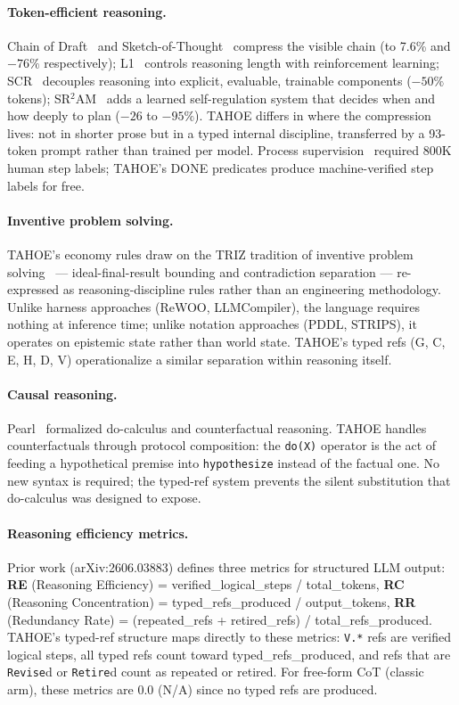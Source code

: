 \documentclass[11pt,a4paper]{article}
\begin{document}
\paragraph{Token-efficient reasoning.}
Chain of Draft~\cite{xu2025cod} and Sketch-of-Thought~\cite{lee2025sketch} compress the visible chain (to 7.6\% and $-76\%$ respectively); L1~\cite{aggarwal2025l1} controls reasoning length with reinforcement learning; SCR~\cite{han2026scr} decouples reasoning into explicit, evaluable, trainable components ($-50\%$ tokens); SR$^2$AM~\cite{deng2026sr2am} adds a learned self-regulation system that decides when and how deeply to plan ($-26$ to $-95\%$). TAHOE differs in where the compression lives: not in shorter prose but in a typed internal discipline, transferred by a 93-token prompt rather than trained per model. Process supervision~\cite{lightman2023verify} required 800K human step labels; TAHOE's DONE predicates produce machine-verified step labels for free.

\paragraph{Inventive problem solving.}
TAHOE's economy rules draw on the TRIZ tradition of inventive problem solving~\cite{altshuller1984creativity} --- ideal-final-result bounding and contradiction separation --- re-expressed as reasoning-discipline rules rather than an engineering methodology. Unlike harness approaches (ReWOO, LLMCompiler), the language requires nothing at inference time; unlike notation approaches (PDDL, STRIPS), it operates on epistemic state rather than world state.
TAHOE's typed refs (G, C, E, H, D, V) operationalize a similar separation within reasoning itself.

\paragraph{Causal reasoning.}
Pearl~\cite{pearl2009causality} formalized do-calculus and counterfactual reasoning.
TAHOE handles counterfactuals through protocol composition: the \texttt{do(X)} operator is the act of feeding a hypothetical premise into \texttt{hypothesize} instead of the factual one.
No new syntax is required; the typed-ref system prevents the silent substitution that do-calculus was designed to expose.

\paragraph{Reasoning efficiency metrics.}
Prior work (arXiv:2606.03883) defines three metrics for structured LLM output:
\textbf{RE} (Reasoning Efficiency) = verified\_logical\_steps / total\_tokens,
\textbf{RC} (Reasoning Concentration) = typed\_refs\_produced / output\_tokens,
\textbf{RR} (Redundancy Rate) = (repeated\_refs + retired\_refs) / total\_refs\_produced.
TAHOE's typed-ref structure maps directly to these metrics: \texttt{V.*} refs are verified logical steps, all typed refs count toward typed\_refs\_produced, and refs that are \texttt{Revise}d or \texttt{Retire}d count as repeated or retired.
For free-form CoT (classic arm), these metrics are 0.0 (N/A) since no typed refs are produced.
\end{document}
